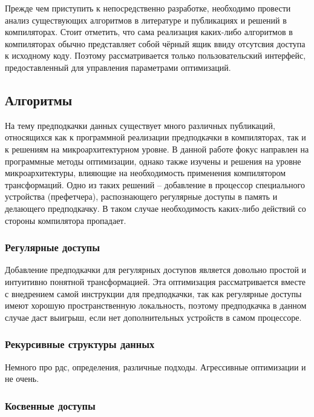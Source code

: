 \documentclass[12pt,a4paper]{article}
\begin{document}
\indent

Прежде чем приступить к непосредственно разработке, необходимо провести анализ существующих алгоритмов в литературе и публикациях и решений в компиляторах. Стоит отметить, что сама реализация каких-либо алгоритмов в компиляторах обычно представляет собой чёрный ящик ввиду отсутсвия доступа к исходному коду. Поэтому рассматривается только пользовательский интерфейс, предоставленный для управления параметрами оптимизаций.

\subsection{Алгоритмы}

\indent

На тему предподкачки данных существует много различных публикаций, относящихся как к программной реализации предподкачки в компиляторах, так и к решениям на микроархитектурном уровне. В данной работе фокус направлен на программные методы оптимизации, однако также изучены и решения на уровне микроархитектуры, влияющие на необходимость применения компилятором трансформаций. Одно из таких решений -- добавление в процессор специального устройства (префетчера), распознающего регулярные доступы в память и делающего предподкачку. В таком случае необходимость каких-либо действий со стороны компилятора пропадает.

\subsubsection{Регулярные доступы}

\indent

Добавление предподкачки для регулярных доступов является довольно простой и интуитивно понятной трансформацией. Эта оптимизация рассматривается вместе с внедрением самой инструкции для предподкачки, так как регулярные доступы имеют хорошую пространственную локальность, поэтому предподкачка в данном случае даст выигрыш, если нет дополнительных устройств в самом процессоре.

\subsubsection{Рекурсивные структуры данных}
Немного про рдс, определения, различные подходы. Агрессивные оптимизации и не очень.

\subsubsection{Косвенные доступы}
\end{document}
